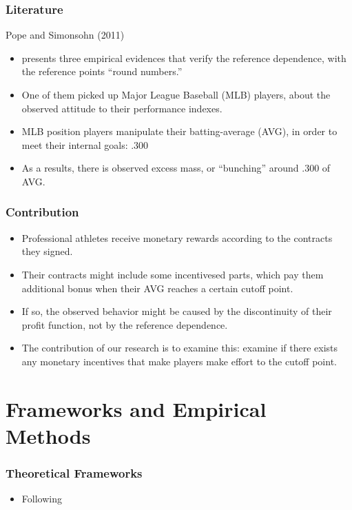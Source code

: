 \documentclass[dvipdfmx,12pt]{beamer}
\begin{document}
\begin{frame}\frametitle{Literature}
  Pope and Simonsohn (2011)
  \begin{itemize}
    \item presents three empirical evidences that verify the reference dependence, with the reference points ``round numbers.''

    \item One of them picked up Major League Baseball (MLB) players, about the observed attitude to their performance indexes.

    \item MLB position players manipulate their batting-average (AVG), in order to meet their internal goals: .300

    \item As a results, there is observed excess mass, or ``bunching'' around .300 of AVG.
  \end{itemize}
\end{frame}

\begin{frame}\frametitle{Contribution}
\begin{itemize}
  \item Professional athletes receive monetary rewards according to the contracts they signed.

  \item Their contracts might include some incentivesed parts, which pay them additional bonus when their AVG reaches a certain cutoff point.

  \item If so, the observed behavior might be caused by the discontinuity of their profit function, not by the reference dependence.

  \item The contribution of our research is to examine this: examine if there exists any monetary incentives that make players make effort to the cutoff point.
\end{itemize}
\end{frame}

\section{Frameworks and Empirical Methods}
\begin{frame}\frametitle{Theoretical Frameworks}
  \begin{itemize}
    \item Following
  \end{itemize}
\end{frame}
\end{document}
